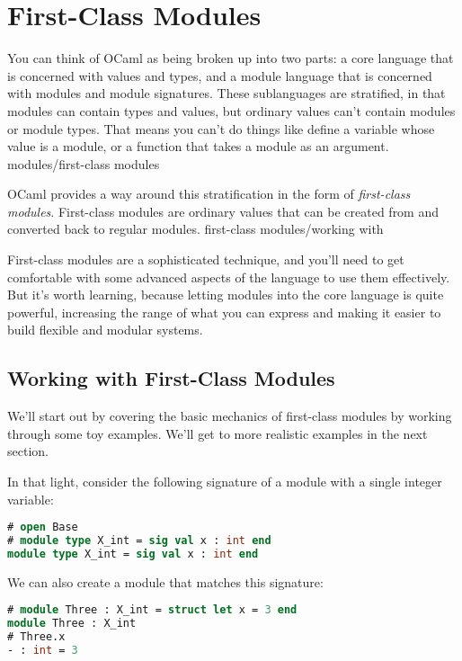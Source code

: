 \hypertarget{first-class-modules}{%
\section{First-Class Modules}\label{first-class-modules}}

You can think of OCaml as being broken up into two parts: a core
language that is concerned with values and types, and a module language
that is concerned with modules and module signatures. These sublanguages
are stratified, in that modules can contain types and values, but
ordinary values can't contain modules or module types. That means you
can't do things like define a variable whose value is a module, or a
function that takes a module as an argument.
\protect\hypertarget{MODfirst}{}{modules/first-class modules}

OCaml provides a way around this stratification in the form of
\emph{first-class modules}. First-class modules are ordinary values that
can be created from and converted back to regular modules.
\protect\hypertarget{FCMwork}{}{first-class modules/working with}

First-class modules are a sophisticated technique, and you'll need to
get comfortable with some advanced aspects of the language to use them
effectively. But it's worth learning, because letting modules into the
core language is quite powerful, increasing the range of what you can
express and making it easier to build flexible and modular {systems}.

\hypertarget{working-with-first-class-modules}{%
\subsection{Working with First-Class
Modules}\label{working-with-first-class-modules}}

We'll start out by covering the basic mechanics of first-class modules
by working through some toy examples. We'll get to more realistic
examples in the next section.

In that light, consider the following signature of a module with a
single integer variable:

\begin{lstlisting}[language=Caml]
# open Base
# module type X_int = sig val x : int end
module type X_int = sig val x : int end
\end{lstlisting}

We can also create a module that matches this signature:

\begin{lstlisting}[language=Caml]
# module Three : X_int = struct let x = 3 end
module Three : X_int
# Three.x
- : int = 3
\end{lstlisting}

